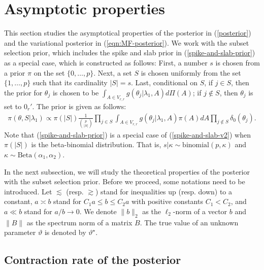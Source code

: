 \documentclass[pdftex, noinfoline, letter]{imsart}
\theoremstyle{plain}
\begin{document}

\section{Asymptotic properties}
\label{sec:postCR}

This section studies the asymptotical properties of the posterior in (\ref{posterior}) and the variational posterior in (\ref{eqn:MF-posterior}).
We work with the subset selection prior, which includes the spike and slab prior in (\ref{spike-and-slab-prior}) as a special case, which is constructed as follows: First, a number $s$ is chosen from a prior $\pi$ on the set $\{0, \dots, p\}$. Next, a set $S$ is chosen uniformly from the set $\{1, \dots, p\}$ such that its cardinality $|S| = s$. 
Last, conditional on $S$, if $j \in S$, then the prior for $\theta_j$ is chosen to be $\int_{A \in V_{r,r}} g(\theta_j|\lambda_1, A) d\Pi(A)$; if $j \not\in S$, then $\theta_j$ is set to $0_r'$.
The prior is given as follows:
\begin{align}
\label{spike-and-slab-v2}
    \pi(\theta, S|\lambda_1)
    \propto 
    \pi(|S|)
    \frac{1}{{p \choose |S|}}
    \prod_{j \in S}
     \int_{A \in V_{r,r}} g(\theta_{j}| \lambda_1, A)\pi(A) dA
    \prod_{j \not\in S} 
    \delta_0(\theta_j).
\end{align}
Note that (\ref{spike-and-slab-prior}) is a special case of (\ref{spike-and-slab-v2}) when $\pi(|S|)$ is the beta-binomial distribution. That is, $s|\kappa \sim \text{binomial}(p, \kappa)$ and $\kappa \sim \text{Beta}(\alpha_1, \alpha_2)$. 

In the next subsection, we will study the theoretical properties of the posterior with the subset selection prior. 
Before we proceed, some notations need to be introduced.
Let $\lesssim$ (resp. $\gtrsim$) stand for inequalities up (resp. down) to a constant, $a \asymp b$ stand for $C_1a \leq b \leq C_2a$ with positive constants $C_1 < C_2$, and
$a \ll b$ stand for $a/b \to 0$.
We denote $\|b\|_2$ as the $\ell_2$-norm of a vector $b$ and $\|B\|$ as the spectrum norm of a matrix $B$.
The true value of an unknown parameter $\vartheta$ is denoted by $\vartheta^\star$.

\subsection{Contraction rate of the posterior}
\end{document}
